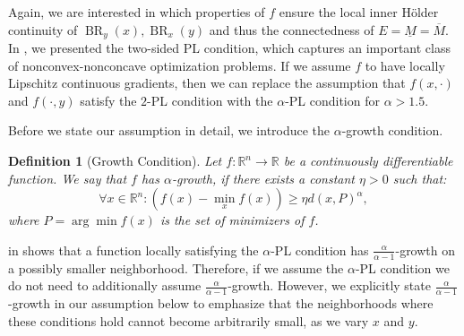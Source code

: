 \documentclass{article}
\newtheorem{definition}{Definition}[section]
\newcommand{\R}{\mathbb{R}}
\DeclareMathOperator{\BR}{BR}
\begin{document}
Again, we are interested in which properties of $f$ ensure the local inner Hölder continuity of $\BR_y(x),\BR_x(y)$ and thus the connectedness of $E=\underline{M}=\overline{M}$. 
In , we presented the two-sided PL condition, which captures an important class of nonconvex-nonconcave optimization problems. If we assume $f$ to have locally Lipschitz continuous gradients, then we can replace the assumption that $f(x,\cdot)$ and $f(\cdot,y)$ satisfy the $2$-PL condition with the $\alpha$-PL condition for $\alpha>1.5$. 

Before we state our assumption in detail, we introduce the $\alpha$-growth condition.
\begin{definition}[Growth Condition]
    \label{def:localgrowth}
    Let $f: \R^n \to \R$ be a continuously differentiable function. We say that $f$ has $\alpha$-growth, if there exists a constant $\eta>0$ such that:
    \begin{equation*}
        \forall x\in \R^n: (f(x)-\min_x f(x)) \geq \eta d(x,P)^\alpha,
    \end{equation*}
    where $P=\arg\min f(x)$ is the set of minimizers of $f$.
\end{definition}

 in  shows that a function locally satisfying the $\alpha$-PL condition has $\frac{\alpha}{\alpha-1}$-growth on a possibly smaller neighborhood. Therefore, if we assume the $\alpha$-PL condition we do not need to additionally assume $\frac{\alpha}{\alpha-1}$-growth. However, we explicitly state $\frac{\alpha}{\alpha-1}$-growth in our assumption below to emphasize that the neighborhoods where these conditions hold cannot become arbitrarily small, as we vary $x$ and $y$.
\end{document}
